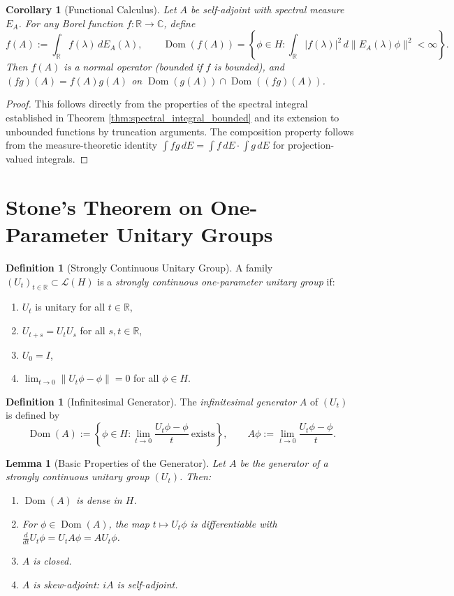 \documentclass[11pt]{article}
\newtheorem{lemma}[theorem]{Lemma}
\newtheorem{corollary}[theorem]{Corollary}
\theoremstyle{definition}
\newtheorem{definition}[theorem]{Definition}
\theoremstyle{remark}
\newcommand{\C}{\mathbb{C}}
\newcommand{\R}{\mathbb{R}}
\newcommand{\1}{\mathbbm{1}}
\newcommand{\norm}[1]{\left\lVert #1 \right\rVert}
\DeclareMathOperator{\Dom}{Dom}
\begin{document}
\begin{corollary}[Functional Calculus]\label{cor:functional_calculus}
Let $A$ be self-adjoint with spectral measure $E_A$. For any Borel function $f:\R\to\C$, define
\[
f(A):=\int_{\R}f(\lambda)\,dE_A(\lambda),\qquad\Dom(f(A))=\left\{\phi\in H:\int_{\R}|f(\lambda)|^2\,d\|E_A(\lambda)\phi\|^2<\infty\right\}.
\]
Then $f(A)$ is a normal operator (bounded if $f$ is bounded), and $(fg)(A)=f(A)g(A)$ on $\Dom(g(A))\cap\Dom((fg)(A))$.
\end{corollary}

\begin{proof}
This follows directly from the properties of the spectral integral established in Theorem \ref{thm:spectral_integral_bounded} and its extension to unbounded functions by truncation arguments. The composition property follows from the measure-theoretic identity $\int fg\,dE=\int f\,dE\cdot\int g\,dE$ for projection-valued integrals.
\end{proof}

\section{Stone's Theorem on One-Parameter Unitary Groups}

\begin{definition}[Strongly Continuous Unitary Group]
A family $(U_t)_{t\in\R}\subset\mathcal{L}(H)$ is a \emph{strongly continuous one-parameter unitary group} if:
\begin{enumerate}[label=(\roman*)]
\item $U_t$ is unitary for all $t\in\R$,
\item $U_{t+s}=U_tU_s$ for all $s,t\in\R$,
\item $U_0=I$,
\item $\lim_{t\to 0}\norm{U_t\phi-\phi}=0$ for all $\phi\in H$.
\end{enumerate}
\end{definition}

\begin{definition}[Infinitesimal Generator]
The \emph{infinitesimal generator} $A$ of $(U_t)$ is defined by
\[
\Dom(A):=\left\{\phi\in H:\lim_{t\to 0}\frac{U_t\phi-\phi}{t}\ \text{exists}\right\},\qquad A\phi:=\lim_{t\to 0}\frac{U_t\phi-\phi}{t}.
\]
\end{definition}

\begin{lemma}[Basic Properties of the Generator]\label{lem:generator_properties}
Let $A$ be the generator of a strongly continuous unitary group $(U_t)$. Then:
\begin{enumerate}[label=(\alph*)]
\item $\Dom(A)$ is dense in $H$.
\item For $\phi\in\Dom(A)$, the map $t\mapsto U_t\phi$ is differentiable with $\frac{d}{dt}U_t\phi=U_tA\phi=AU_t\phi$.
\item $A$ is closed.
\item $A$ is skew-adjoint: $iA$ is self-adjoint.
\end{enumerate}
\end{lemma}
\end{document}
